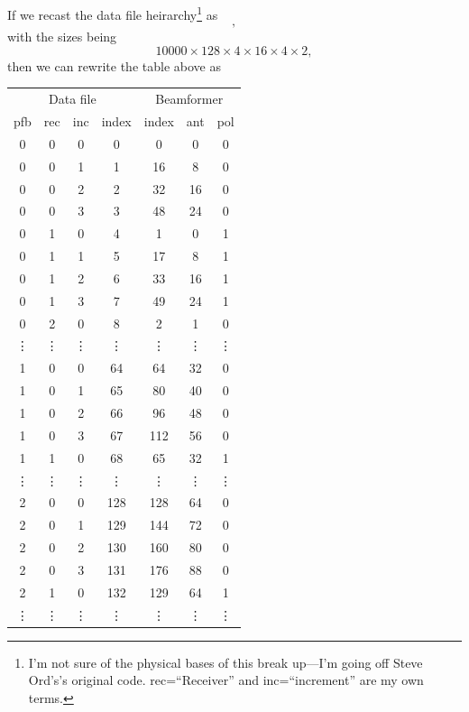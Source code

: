 \documentclass{article}
\begin{document}
\newpage
\noindent If we recast the data file heirarchy\footnote{I'm not sure of the physical bases of this break up---I'm going off Steve Ord's's original code. rec=``Receiver'' and inc=``increment'' are my own terms.} as
\begin{equation}
    [\text{time sample}][\text{channel}][\text{pfb}][\text{receiver}][\text{increment}][\text{complexity}],
\end{equation}
with the sizes being
\begin{equation}
    10000 \times 128 \times 4 \times 16 \times 4 \times 2,
\end{equation}
then we can rewrite the table above as
\begin{table}[!h]
    \centering
    \begin{tabular}{cccc|ccc}
        \multicolumn{4}{c}{Data file} & \multicolumn{3}{c}{Beamformer} \\
        pfb & rec & inc & index & index & ant & pol \\
        \hline
        0 & 0 & 0 & 0 &  0 &  0 & 0 \\
        0 & 0 & 1 & 1 & 16 &  8 & 0 \\
        0 & 0 & 2 & 2 & 32 & 16 & 0 \\
        0 & 0 & 3 & 3 & 48 & 24 & 0 \\
        0 & 1 & 0 & 4 &  1 &  0 & 1 \\
        0 & 1 & 1 & 5 & 17 &  8 & 1 \\
        0 & 1 & 2 & 6 & 33 & 16 & 1 \\
        0 & 1 & 3 & 7 & 49 & 24 & 1 \\
        0 & 2 & 0 & 8 &  2 &  1 & 0 \\
        \vdots & \vdots & \vdots & \vdots & \vdots & \vdots & \vdots \\
        1 & 0 & 0 & 64 &  64 & 32 & 0 \\
        1 & 0 & 1 & 65 &  80 & 40 & 0 \\
        1 & 0 & 2 & 66 &  96 & 48 & 0 \\
        1 & 0 & 3 & 67 & 112 & 56 & 0 \\
        1 & 1 & 0 & 68 &  65 & 32 & 1 \\
        \vdots & \vdots & \vdots & \vdots & \vdots & \vdots & \vdots \\
        2 & 0 & 0 & 128 & 128 & 64 & 0 \\
        2 & 0 & 1 & 129 & 144 & 72 & 0 \\
        2 & 0 & 2 & 130 & 160 & 80 & 0 \\
        2 & 0 & 3 & 131 & 176 & 88 & 0 \\
        2 & 1 & 0 & 132 & 129 & 64 & 1 \\
        \vdots & \vdots & \vdots & \vdots & \vdots & \vdots & \vdots \\
    \end{tabular}
\end{table}
\end{document}
